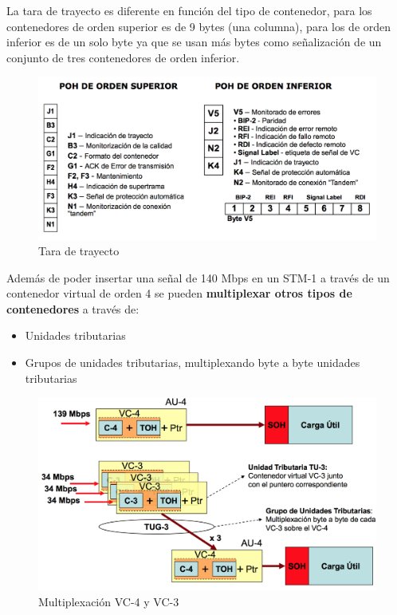 \documentclass[10pt,portrait, twocolumn]{article}
\begin{document}
La tara de trayecto es diferente en función del tipo de contenedor, para los contenedores de orden superior es de 9 bytes (una columna), para los de orden inferior es de un solo byte ya que se usan más bytes como señalización de un conjunto de tres contenedores de orden inferior.

	\begin{figure}[!ht]
 		\centering
  		 \includegraphics[scale = 0.4]{images/POH}
		\caption{Tara de trayecto}
	\end{figure}
	
Además de poder insertar una señal de 140 Mbps en un STM-1 a través de un contenedor virtual de orden 4 se pueden \textbf{multiplexar otros tipos de contenedores} a través de:

	\begin{itemize}
		\item Unidades tributarias
		\item Grupos de unidades tributarias, multiplexando byte a byte unidades tributarias
	\end{itemize}
	
	\begin{figure}[!ht]
 		\centering
  		 \includegraphics[scale = 0.4]{images/VCMux}
		\caption{Multiplexación VC-4 y VC-3}
	\end{figure}
\end{document}
